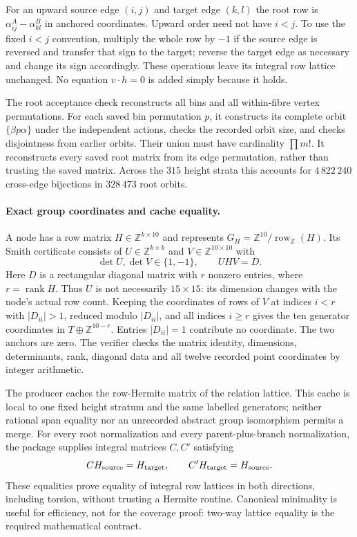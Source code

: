 \documentclass[11pt]{article}
\theoremstyle{remark}
\newcommand{\Z}{\mathbb Z}
\newcommand{\rank}{\operatorname{rank}}
\newcommand{\row}{\operatorname{row}}
\begin{document}
For an upward source edge $(i,j)$ and target edge $(k,l)$ the root row
is $\alpha_{ij}^A-\alpha_{kl}^B$ in anchored coordinates. Upward order
need not have $i<j$. To use the fixed $i<j$ convention, multiply the
whole row by $-1$ if the source edge is reversed and transfer that
sign to the target; reverse the target edge as necessary and change
its sign accordingly. These operations leave its integral row lattice
unchanged. No equation $v\cdot h=0$ is added simply because it holds.

The root acceptance check reconstructs all bins and all within-fibre
vertex permutations. For each saved bin permutation $p$, it constructs
its complete orbit $\{\beta p\alpha\}$ under the independent actions,
checks the recorded orbit size, and checks disjointness from earlier
orbits. Their union must have cardinality $\prod m!$. It reconstructs
every saved root matrix from its edge permutation, rather than trusting
the saved matrix. Across the $315$ height strata this accounts for
$4\,822\,240$ cross-edge bijections in $328\,473$ root orbits.

\paragraph{Exact group coordinates and cache equality.}
A node has a row matrix $H\in\Z^{k\times10}$ and represents
$G_H=\Z^{10}/\row_\Z(H)$. Its Smith certificate consists of
$U\in\Z^{k\times k}$ and $V\in\Z^{10\times10}$ with
\[
 \det U,\det V\in\{1,-1\},\qquad UHV=D.
\]
Here $D$ is a rectangular diagonal matrix with $r$ nonzero entries,
where $r=\rank H$. Thus $U$ is not necessarily $15\times15$:
its dimension changes with the node's actual row count. Keeping the
coordinates of rows of $V$ at indices $i<r$ with $|D_{ii}|>1$, reduced
modulo $|D_{ii}|$, and all indices $i\ge r$ gives the ten generator
coordinates in $T\oplus\Z^{10-r}$. Entries $|D_{ii}|=1$ contribute
no coordinate. The two anchors are zero. The verifier checks the
matrix identity, dimensions, determinants, rank, diagonal data and all
twelve recorded point coordinates by integer arithmetic.

The producer caches the row-Hermite matrix of the relation lattice.
This cache is local to one fixed height stratum and the same labelled
generators; neither rational span equality nor an unrecorded abstract
group isomorphism permits a merge. For every root normalization and
every parent-plus-branch normalization, the package supplies integral
matrices $C,C'$ satisfying
\[
 C H_{\rm source}=H_{\rm target},\qquad
 C'H_{\rm target}=H_{\rm source}.
\]
These equalities prove equality of integral row lattices in both
directions, including torsion, without trusting a Hermite routine.
Canonical minimality is useful for efficiency, not for the coverage
proof: two-way lattice equality is the required mathematical contract.
\end{document}
